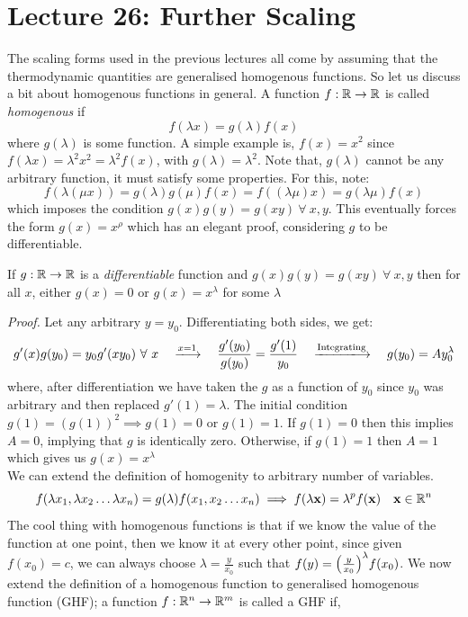 \section*{Lecture 26: Further Scaling}
The scaling forms used in the previous lectures all come by assuming that the thermodynamic quantities are generalised homogenous functions. So let us discuss a bit about homogenous functions in general. A function $f:\mathbb{R} \to \mathbb{R}$ is called \textit{homogenous} if $$f(\lambda x) = g(\lambda) f(x)$$ 
where $g(\lambda)$ is some function. A simple example is, $f(x) = x^2$ since $f(\lambda x) = \lambda^2 x^2 = \lambda^2  f(x)$, with $g(\lambda) = \lambda^2$. Note that, $g(\lambda)$ cannot be any arbitrary function, it must satisfy some properties. For this, note: 
$$f(\lambda (\mu x)) = g(\lambda) g(\mu)f(x) = f((\lambda \mu)x) = g(\lambda \mu) f(x)$$
which imposes the condition $g(x) g(y) = g(xy)\ \forall \ x,y$. This eventually forces the form $g(x) = x^\rho$ which has an elegant proof, considering $g$ to be differentiable. 
\begin{proposition}
    If $g: \mathbb{R}\to \mathbb{R}$ is a \textit{differentiable} function and $g(x) g(y) = g(xy)\ \forall \ x,y$ then for all $x$, either $g(x)=0$ or $g(x) = x^\lambda$ for some $\lambda$
\end{proposition}
\textit{Proof.} Let any arbitrary $y=y_0$. Differentiating both sides, we get:
$$g'(x) g(y_0) = y_0 g'(xy_0)\ \forall \ x\quad \xlongrightarrow{x=1} \quad  \frac{g'(y_0)}{g(y_0)} = \frac{g'(1)}{y_0}\quad\xlongrightarrow{\text{Integrating}} \quad g(y_0) = A y_0^\lambda$$
where, after differentiation we have taken the $g$ as a function of $y_0$ since $y_0$ was arbitrary and then replaced $g'(1) = \lambda$. The initial condition $g(1) = (g(1))^2 \implies g(1)=0$ or $g(1)=1$. If $g(1) = 0$ then this implies $A=0$, implying that $g$ is identically zero. Otherwise, if $g(1) = 1$ then $A =1$ which gives us $g(x) = x^\lambda$\\[0.2cm]
We can extend the definition of homogenity to arbitrary number of variables. 
$$f(\lambda x_1, \lambda x_2\ldots \lambda x_n)  = g(\lambda) f(x_1,x_2\ldots x_n) \implies f(\lambda \vb{x}) = \lambda^p f(\vb{x})\quad \vb{x} \in \mathbb{R}^{n}$$
The cool thing with homogenous functions is that if we know the value of the function at one point, then we know it at every other point, since given $f(x_0)=c$, we can always choose $\lambda = \frac{y}{x_0}$ such that $f(y) =\qty(\frac{y}{x_0})^\lambda f(x_0) $. We now extend the definition of a homogenous function to generalised homogenous function (GHF); a function $f:\mathbb{R}^n \to \mathbb{R}^m$ is called a GHF if, 
